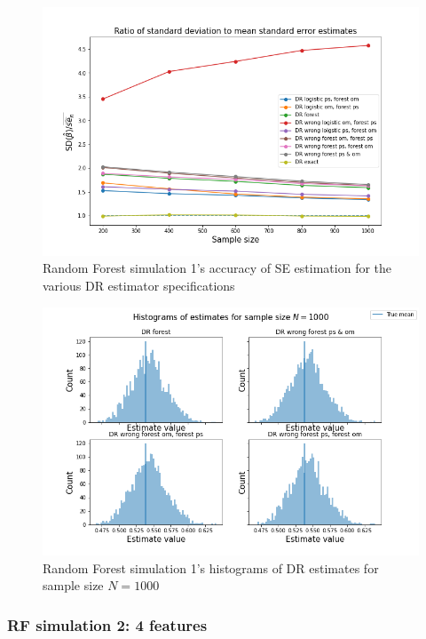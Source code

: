 \documentclass[12pt,twoside]{article}
\begin{document}
\begin{figure}[h!]
    \centering
    \includegraphics[width = 0.9\columnwidth]{figures/SERF.png}
    \caption{Random Forest simulation 1's accuracy of \citet{lunceford_davidian} SE estimation for the various DR estimator specifications}
    \label{figSERF}
\end{figure}

\begin{figure}[h!]
    \centering
    \includegraphics[width = 0.9\columnwidth]{figures/histRF.png}
    \caption{Random Forest simulation 1's histograms of DR estimates for sample size $N = 1000$}
    \label{fighistRF}
\end{figure}

\clearpage
\subsubsection{RF simulation 2: 4 features}
\end{document}
